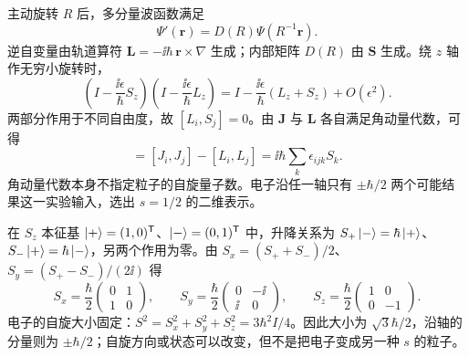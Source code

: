 
主动旋转 $R$ 后，多分量波函数满足
\begin{equation}
  \Psi'(\mathbf r)=D(R)\Psi(R^{-1}\mathbf r).
\end{equation}
逆自变量由轨道算符 $\mathbf L=-\ii\hbar\,\mathbf r\times\nabla$ 生成；内部矩阵 $D(R)$ 由 $\mathbf S$ 生成。绕 $z$ 轴作无穷小旋转时，
\begin{equation}
  \left(I-\frac{\ii\epsilon}{\hbar}S_z\right)
  \left(I-\frac{\ii\epsilon}{\hbar}L_z\right)
  =I-\frac{\ii\epsilon}{\hbar}(L_z+S_z)+O(\epsilon^2).
\end{equation}
两部分作用于不同自由度，故 $[L_i,S_j]=0$。由 $\mathbf J$ 与 $\mathbf L$ 各自满足角动量代数，可得
\begin{equation}
  [S_i,S_j]=[J_i,J_j]-[L_i,L_j]
   =\ii\hbar\sum_k\epsilon_{ijk}S_k.
\end{equation}
角动量代数本身不指定粒子的自旋量子数。电子沿任一轴只有 $\pm\hbar/2$ 两个可能结果这一实验输入，选出 $s=1/2$ 的二维表示。

在 $S_z$ 本征基 $\left|+\right\rangle= (1,0)^{\mathsf T}$、$\left|-\right\rangle=(0,1)^{\mathsf T}$ 中，升降关系为 $S_+\left|-\right\rangle=\hbar\left|+\right\rangle$、$S_-\left|+\right\rangle=\hbar\left|-\right\rangle$，另两个作用为零。由 $S_x=(S_++S_-)/2$、$S_y=(S_+-S_-)/(2\ii)$ 得
\begin{equation}
  S_x=\frac\hbar2\begin{pmatrix}0&1\\1&0\end{pmatrix},\qquad
  S_y=\frac\hbar2\begin{pmatrix}0&-\ii\\\ii&0\end{pmatrix},\qquad
  S_z=\frac\hbar2\begin{pmatrix}1&0\\0&-1\end{pmatrix}.
\end{equation}
电子的自旋大小固定：$S^2=S_x^2+S_y^2+S_z^2=3\hbar^2I/4$。因此大小为 $\sqrt3\hbar/2$，沿轴的分量则为 $\pm\hbar/2$；自旋方向或状态可以改变，但不是把电子变成另一种 $s$ 的粒子。

